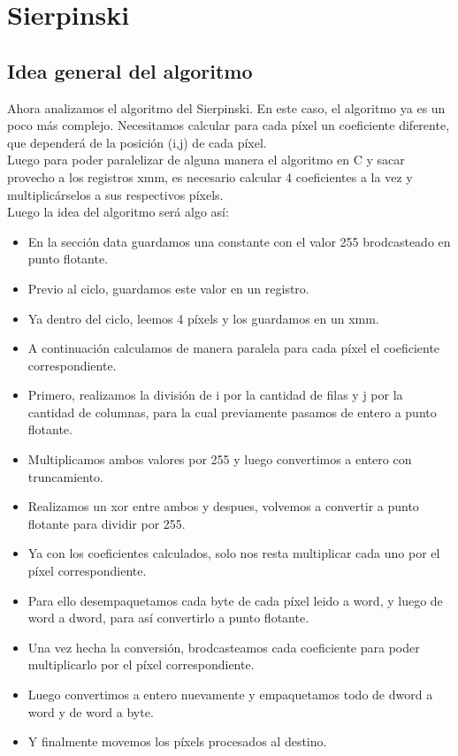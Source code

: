 \documentclass[a4paper]{article}
\begin{document}
\section{Sierpinski}

\subsection{Idea general del algoritmo}

Ahora analizamos el algoritmo del Sierpinski. En este caso, el algoritmo ya es un poco más complejo. Necesitamos calcular para cada píxel un coeficiente diferente, que dependerá de la posición (i,j) de cada píxel.
\\
Luego para poder paralelizar de alguna manera el algoritmo en C y sacar provecho a los registros xmm, es necesario calcular 4 coeficientes a la vez y multiplicárselos a sus respectivos píxels.
\\
Luego la idea del algoritmo será algo así:

\begin{itemize}
\item En la sección data guardamos una constante con el valor 255 brodcasteado en punto flotante.
\item Previo al ciclo, guardamos este valor en un registro.
\item Ya dentro del ciclo, leemos 4 píxels y los guardamos en un xmm.
\item A continuación calculamos de manera paralela para cada píxel el coeficiente correspondiente.
\item Primero, realizamos la división de i por la cantidad de filas y j por la cantidad de columnas, para la cual previamente pasamos de entero a punto flotante.
\item Multiplicamos ambos valores por 255 y luego convertimos a entero con truncamiento.
\item Realizamos un xor entre ambos y despues, volvemos a convertir a punto flotante para dividir por 255.
\item Ya con los coeficientes calculados, solo nos resta multiplicar cada uno por el píxel correspondiente.
\item Para ello desempaquetamos cada byte de cada píxel leido a word, y luego de word a dword, para así convertirlo a punto flotante.
\item Una vez hecha la conversión, brodcasteamos cada coeficiente para poder multiplicarlo por el píxel correspondiente.
\item Luego convertimos a entero nuevamente y empaquetamos todo de dword a word y de word a byte.
\item Y finalmente movemos los píxels procesados al destino.
\end{itemize}
\end{document}
